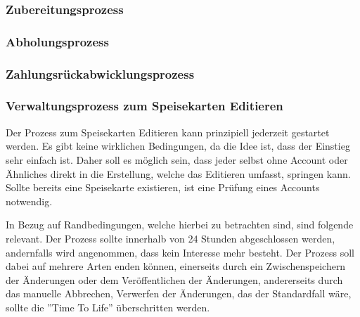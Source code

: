 

\subsubsection{Zubereitungsprozess}
\clearpage
{}

\subsubsection{Abholungsprozess}
\clearpage
{}

\subsubsection{Zahlungsrückabwicklungsprozess}
\clearpage
{}

\subsubsection{Verwaltungsprozess zum Speisekarten Editieren}
Der Prozess zum Speisekarten Editieren kann prinzipiell jederzeit gestartet werden. Es gibt keine wirklichen Bedingungen, da die Idee ist, dass der Einstieg sehr einfach ist. Daher soll es möglich sein, dass jeder selbst ohne Account oder Ähnliches direkt in die Erstellung, welche das Editieren umfasst, springen kann. Sollte bereits eine Speisekarte existieren, ist eine Prüfung eines Accounts notwendig.

In Bezug auf Randbedingungen, welche hierbei zu betrachten sind, sind folgende relevant. Der Prozess sollte innerhalb von 24 Stunden abgeschlossen werden, andernfalls wird angenommen, dass kein Interesse mehr besteht. Der Prozess soll dabei auf mehrere Arten enden können, einerseits durch ein Zwischenspeichern der Änderungen oder dem Veröffentlichen der Änderungen, andererseits durch das manuelle Abbrechen, Verwerfen der Änderungen, das der Standardfall wäre, sollte die ''Time To Life'' überschritten werden.

